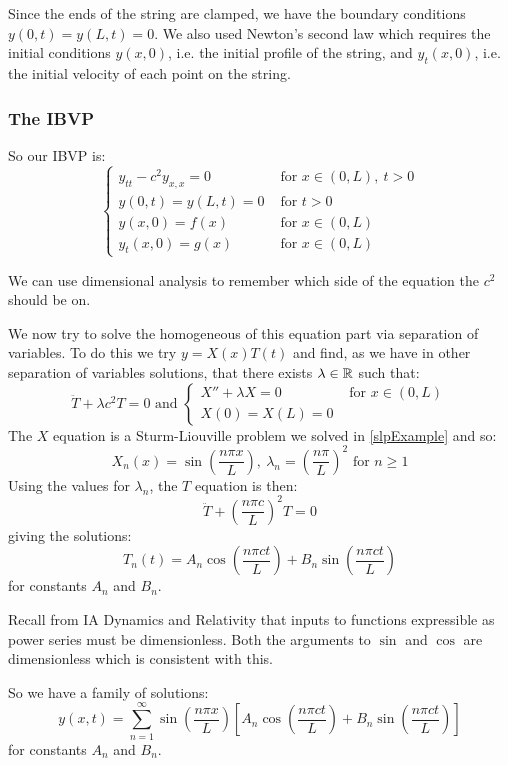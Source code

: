 \documentclass[../main.tex]{subfiles}
\begin{document}
Since the ends of the string are clamped, we have the boundary conditions $y(0, t) = y(L, t) = 0$.
We also used Newton's second law which requires the initial conditions $y(x, 0)$, i.e. the initial profile of the string, and $y_{t}(x, 0)$, i.e. the initial velocity of each point on the string.
\subsubsection{The IBVP}
So our IBVP is:
\begin{equation}
  \label{waveEqn}
  \begin{cases}
  y_{t t} - c^2 y_{x, x} = 0 & \text{ for } x \in (0, L),\ t > 0 \\
  y(0, t) = y(L, t) = 0 & \text{ for } t > 0 \\
  y(x, 0) = f(x) & \text{ for } x \in (0, L) \\
  y_t(x, 0) = g(x) & \text{ for } x \in (0, L)
  \end{cases}
\end{equation}
\begin{remark}[Memorisation]
  We can use dimensional analysis to remember which side of the equation the $c^2$ should be on.
\end{remark}
We now try to solve the homogeneous of this equation part via separation of variables.
To do this we try $y = X(x)T(t)$ and find, as we have in other separation of variables solutions, that there exists $\lambda \in \mathbb{R}$ such that:
\[
  \ddot{T} + \lambda c^2 T = 0 \text{ and } \begin{cases}
  X'' + \lambda X = 0 & \text{ for } x \in (0, L)\\
  X(0) = X(L) = 0  &
  \end{cases}
\]
The $X$ equation is a Sturm-Liouville problem we solved in \cref{slpExample} and so:
\[
  X_n(x) = \sin\left(\frac{n \pi x}{L}\right),\ \lambda_n = \left(\frac{n\pi}{L}\right)^2 \text{ for $n \geq 1$}
\]
Using the values for $\lambda_n$, the $T$ equation is then:
\[
  \ddot{T} + \left(\frac{n \pi c}{L}\right)^2 T = 0
\]
giving the solutions:
\[
  T_n(t) = A_n \cos\left(\frac{n \pi ct}{L}\right) + B_n \sin\left(\frac{n \pi ct}{L}\right)
\]
for constants $A_n$ and $B_n$.
\begin{remark}
  Recall from IA Dynamics and Relativity that inputs to functions expressible as power series must be dimensionless.
  Both the arguments to $\sin$ and $\cos$ are dimensionless which is consistent with this.
\end{remark}
So we have a family of solutions:
\[
  y(x, t) = \sum_{n = 1}^{\infty} \sin\left(\frac{n\pi x}{L}\right)\left[A_n \cos\left(\frac{n \pi ct}{L}\right) + B_n \sin\left(\frac{n \pi ct}{L}\right)\right]
\]
for constants $A_n$ and $B_n$.
\end{document}
